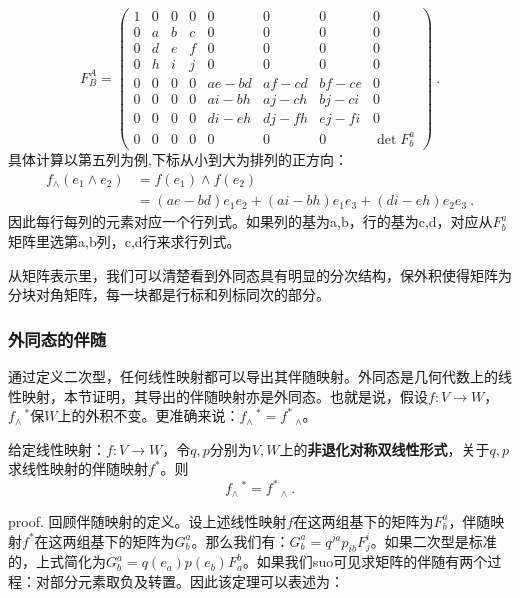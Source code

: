 \begin{equation}
F_B^A=\left(\begin{array}{cccccccc}
1 & 0 & 0 & 0 & 0 & 0 & 0 & 0 \\
0 & a & b & c & 0 & 0 & 0 & 0 \\
0 & d & e & f & 0 & 0 & 0 & 0 \\
0 & h & i & j & 0 & 0 & 0 & 0 \\
0 & 0 & 0 & 0 & a e-b d & a f-c d & b f-c e & 0 \\
0 & 0 & 0 & 0 & a i-b h & a j-c h & b j-c i & 0 \\
0 & 0 & 0 & 0 & d i-e h & d j-f h & e j-f i & 0 \\
0 & 0 & 0 & 0 & 0 & 0 & 0 & \operatorname{det} F_b^a
\end{array}\right) ~.
\end{equation}
具体计算以第五列为例,下标从小到大为排列的正方向：
\begin{equation}
\begin{aligned}
f_\wedge(e_1\wedge e_2)&=f(e_1)\wedge f(e_2)\\
&=(a e-b d)e_1 e_2+(a i-b h)e_1 e_3+ (d i-e h)e_2 e_3~.
\end{aligned}
\end{equation}
因此每行每列的元素对应一个行列式。如果列的基为a,b，行的基为c,d，对应从$F^a_b$矩阵里选第a,b列，c,d行来求行列式。

从矩阵表示里，我们可以清楚看到外同态具有明显的分次结构，保外积使得矩阵为分块对角矩阵，每一块都是行标和列标同次的部分。
\subsubsection{外同态的伴随}
通过定义二次型，任何线性映射都可以导出其伴随映射。外同态是几何代数上的线性映射，本节证明，其导出的伴随映射亦是外同态。也就是说，假设$f:V\rightarrow W$，$f_{\wedge}\,^*$保$W$上的外积不变。更准确来说：$f_{\wedge}\,^*=f^*\,_{\wedge}$。

\begin{theorem}{}
给定线性映射：$f:V\rightarrow W$，令$q,p$分别为$V,W$上的\textbf{非退化对称双线性形式}，关于$q,p$求线性映射的伴随映射$f^*$。则
\begin{equation}
f_{\wedge}\,^*=f^*\,_{\wedge}~.
\end{equation}
\end{theorem}
proof.
回顾伴随映射的定义。设上述线性映射$f$在这两组基下的矩阵为$F^a_b$，伴随映射$f^*$在这两组基下的矩阵为$G^a_b$。那么我们有：$G^a_b =q^{ja}p_{ib}F^i_j$。如果二次型是标准的，上式简化为$G^a_b=q(e_a)p(e_b)F^b_a$。如果我们suo可见求矩阵的伴随有两个过程：对部分元素取负及转置。因此该定理可以表述为：

